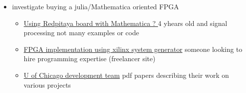 \documentclass[hyperref,idxtotoc]{labbook}
\begin{document}
\begin{itemize}
\item investigate buying a julia/Mathematica oriented FPGA
  \begin{itemize}
  \item \href{https://community.wolfram.com/groups/-/m/t/563691}{ Using Redpitaya board with Mathematica ? } 4 yhears old  and signal processing not many examples or code
  \item
   \href{https://www.freelancer.com/projects/matlab-mathematica/fpga-implementation-using-xilinx-system/}{
FPGA implementation using xilinx system generator}  someone looking to hire programming expertise  (freelancer site)
\item \href{http://simonlab.uchicago.edu/FPGA.html}{U of Chicago development team}  pdf papers describing their work on various projects
  \end{itemize}
\end{itemize}
\end{document}
